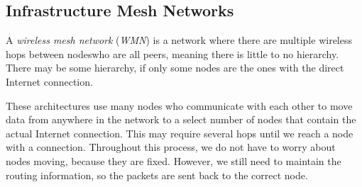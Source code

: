 \subsection{Infrastructure Mesh Networks}\label{subsec:Infrastructure_Mesh_Networks}
\begin{definition}\label{def:Wireless_Mesh_Network}
  A \emph{wireless mesh network} (\emph{WMN}) is a network where there are multiple wireless hops between nodeswho are all peers, meaning there is little to no hierarchy.
  There may be some hierarchy, if only some nodes are the ones with the direct Internet connection.
\end{definition}

These architectures use many nodes who communicate with each other to move data from anywhere in the network to a select number of nodes that contain the actual Internet connection.
This may require several hops until we reach a node with a connection.
Throughout this process, we do not have to worry about nodes moving, because they are fixed.
However, we still need to maintain the routing information, so the packets are sent back to the correct node.

